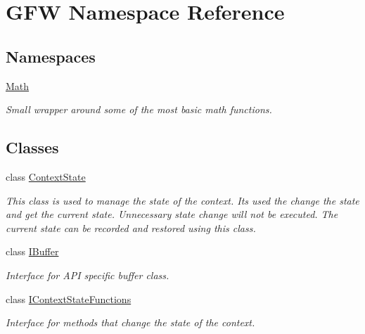 \hypertarget{namespace_g_f_w}{}\section{G\+FW Namespace Reference}
\label{namespace_g_f_w}
\subsection*{Namespaces}
\begin{DoxyCompactItemize}
\item 
 \hyperlink{namespace_g_f_w_1_1_math}{Math}
\begin{DoxyCompactList}\small\item\em Small wrapper around some of the most basic math functions. \end{DoxyCompactList}\end{DoxyCompactItemize}
\subsection*{Classes}
\begin{DoxyCompactItemize}
\item 
class \hyperlink{class_g_f_w_1_1_context_state}{Context\+State}
\begin{DoxyCompactList}\small\item\em This class is used to manage the state of the context. It\textquotesingle{}s used the change the state and get the current state. Unnecessary state change will not be executed. The current state can be recorded and restored using this class. \end{DoxyCompactList}\item 
class \hyperlink{class_g_f_w_1_1_i_buffer}{I\+Buffer}
\begin{DoxyCompactList}\small\item\em Interface for A\+PI specific buffer class. \end{DoxyCompactList}\item 
class \hyperlink{class_g_f_w_1_1_i_context_state_functions}{I\+Context\+State\+Functions}
\begin{DoxyCompactList}\small\item\em Interface for methods that change the state of the context. \end{DoxyCompactList}\end{DoxyCompactItemize}
